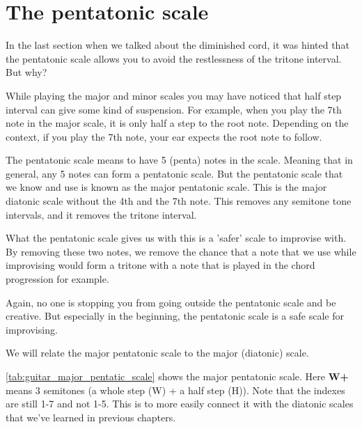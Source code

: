 \section{The pentatonic scale}

In the last section when we talked about the diminished cord, it was hinted that the pentatonic scale allows you to avoid the restlessness of the tritone interval. But why?

While playing the major and minor scales you may have noticed that half step interval can give some kind of suspension. For example, when you play the 7th note in the major scale, it is only half a step to the root note. Depending on the context, if you play the 7th note, your ear expects the root note to follow.

The pentatonic scale means to have 5 (penta) notes in the scale. Meaning that in general, any 5 notes can form a pentatonic scale. But the pentatonic scale that we know and use is known as the major pentatonic scale. This is the major diatonic scale without the 4th and the 7th note. This removes any semitone tone intervals, and it removes the tritone interval.


What the pentatonic scale gives us with this is a 'safer' scale to improvise with. By removing these two notes, we remove the chance that a note that we use while improvising would form a tritone with a note that is played in the chord progression for example.

Again, no one is stopping you from going outside the pentatonic scale and be creative. But especially in the beginning, the pentatonic scale is a safe scale for improvising.

\newpage

We will relate the major pentatonic scale to the major (diatonic) scale.

\autoref{tab:guitar_major_pentatic_scale} shows the major pentatonic scale. Here \textbf{W+} means 3 semitones (a whole step (W) + a half step (H)). Note that the indexes are still 1-7 and not 1-5. This is to more easily connect it with the diatonic scales that we've learned in previous chapters.

